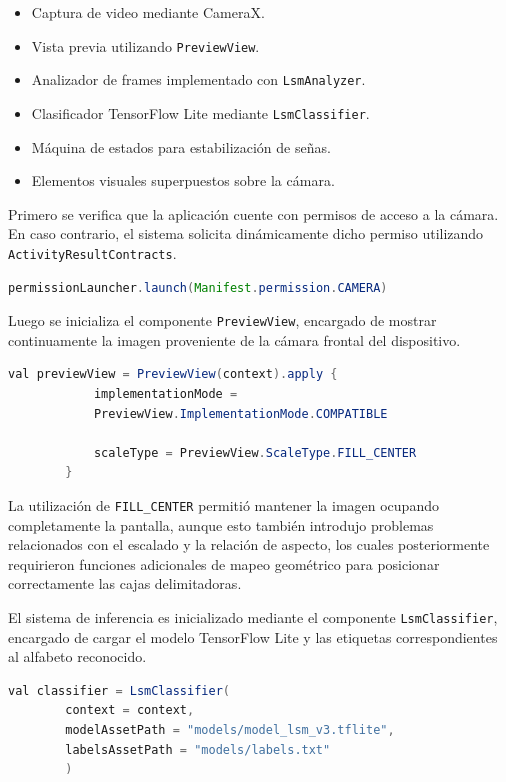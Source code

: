 	\begin{itemize}
		\item Captura de video mediante CameraX.
		\item Vista previa utilizando \texttt{PreviewView}.
		\item Analizador de frames implementado con \texttt{LsmAnalyzer}.
		\item Clasificador TensorFlow Lite mediante \texttt{LsmClassifier}.
		\item Máquina de estados para estabilización de señas.
		\item Elementos visuales superpuestos sobre la cámara.
	\end{itemize}
	
	Primero se verifica que la aplicación cuente con permisos de acceso
	a la cámara. En caso contrario, el sistema solicita dinámicamente dicho
	permiso utilizando \texttt{ActivityResultContracts}.
	
	\begin{lstlisting}[language=Java]
		permissionLauncher.launch(Manifest.permission.CAMERA)
	\end{lstlisting}
	
	Luego se inicializa el componente \texttt{PreviewView},
	encargado de mostrar continuamente la imagen proveniente de la cámara
	frontal del dispositivo.
	
	\begin{lstlisting}[language=Java]
		val previewView = PreviewView(context).apply {
			implementationMode =
			PreviewView.ImplementationMode.COMPATIBLE
			
			scaleType = PreviewView.ScaleType.FILL_CENTER
		}
	\end{lstlisting}
	
	La utilización de \texttt{FILL\_CENTER} permitió mantener la imagen
	ocupando completamente la pantalla, aunque esto también introdujo
	problemas relacionados con el escalado y la relación de aspecto,
	los cuales posteriormente requirieron funciones adicionales de
	mapeo geométrico para posicionar correctamente las cajas delimitadoras.
	
	El sistema de inferencia es inicializado mediante el componente
	\texttt{LsmClassifier}, encargado de cargar el modelo TensorFlow Lite
	y las etiquetas correspondientes al alfabeto reconocido.
	
	\begin{lstlisting}[language=Java]
		val classifier = LsmClassifier(
		context = context,
		modelAssetPath = "models/model_lsm_v3.tflite",
		labelsAssetPath = "models/labels.txt"
		)
	\end{lstlisting}
	
